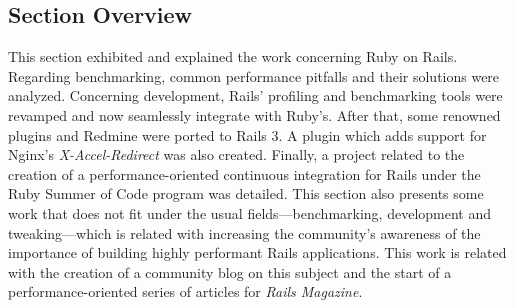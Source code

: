 \subsection{Section Overview}
This section exhibited and explained the work concerning Ruby on Rails. Regarding benchmarking, common performance pitfalls and their solutions were analyzed. Concerning development, Rails' profiling and benchmarking tools were revamped and now seamlessly integrate with Ruby's. After that, some renowned plugins and Redmine were ported to Rails 3. A plugin which adds support for Nginx's \textit{X-Accel-Redirect} was also created. Finally, a project related to the creation of a performance-oriented continuous integration for Rails under the Ruby Summer of Code program was detailed. This section also presents some work that does not fit under the usual fields---benchmarking, development and tweaking---which is related with increasing the community's awareness of the importance of building highly performant Rails applications. This work is related with the creation of a community blog on this subject and the start of a performance-oriented series of articles for \textit{Rails Magazine}. 
